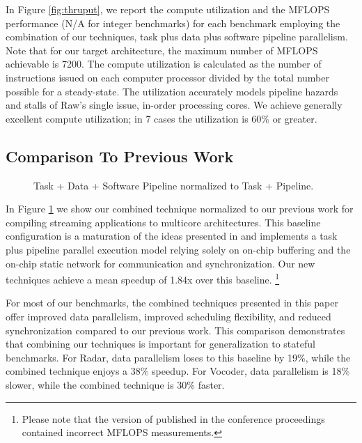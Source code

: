 In Figure \ref{fig:thruput}, we report the compute utilization and the
MFLOPS performance (N/A for integer benchmarks) for each benchmark
employing the combination of our techniques, task plus data plus
software pipeline parallelism. Note that for our target architecture,
the maximum number of MFLOPS achievable is 7200.  The compute
utilization is calculated as the number of instructions issued on each
computer processor divided by the total number possible for a
steady-state.  The utilization accurately models pipeline hazards and
stalls of Raw's single issue, in-order processing cores.  We achieve
generally excellent compute utilization; in 7 cases the utilization is
60\% or greater.


\subsection{Comparison To Previous Work}

\begin{figure}[t]
\centering
{}
\caption{Task + Data + Software Pipeline normalized to Task + Pipeline.
\protect\label{fig:vs-space}}
\end{figure}

\begin{figure*}[t]
\centering
{}
\caption{Comparison and Task + Data + Software Pipeline Performance Results.
\protect\label{fig:thruput}}
\end{figure*}
In Figure \ref{fig:vs-space} we show our combined technique normalized
to our previous work for compiling streaming applications to multicore
architectures.  This baseline configuration is a maturation of the
ideas presented in \cite{streamit-asplos} and implements a task plus
pipeline parallel execution model relying solely on on-chip buffering
and the on-chip static network for communication and
synchronization. Our new techniques achieve a mean speedup of 1.84x
over this baseline. \footnote{Please note that the version of
\cite{streamit-asplos} published in the conference proceedings 
contained incorrect MFLOPS measurements.}


For most of our benchmarks, the combined techniques presented in this
paper offer improved data parallelism, improved scheduling
flexibility, and reduced synchronization compared to our previous
work. This comparison demonstrates that combining our techniques is
important for generalization to stateful benchmarks.  For Radar, data
parallelism loses to this baseline by 19\%, while the combined
technique enjoys a 38\% speedup. For Vocoder, data parallelism is 18\%
slower, while the combined technique is 30\% faster.

